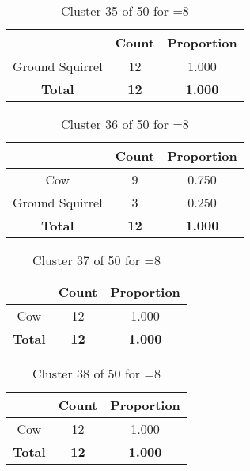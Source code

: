 \begin{table}[ht!]
\centering
\begin{tabular}{|c|c|c|}
\hline
\bf \Spec{} &\bf Count &\bf Proportion\\ \hline \hline
Ground Squirrel & 12 & 1.000\\ \hline
\hline
\bf Total & \bf 12 & \bf 1.000\\ \hline
\end{tabular}
\label{tab:cluster:35:8}
\caption{Cluster 35 of 50 for \minneigh{}=8}
\end{table}

\begin{table}[ht!]
\centering
\begin{tabular}{|c|c|c|}
\hline
\bf \Spec{} &\bf Count &\bf Proportion\\ \hline \hline
Cow & 9 & 0.750\\ \hline
Ground Squirrel & 3 & 0.250\\ \hline
\hline
\bf Total & \bf 12 & \bf 1.000\\ \hline
\end{tabular}
\label{tab:cluster:36:8}
\caption{Cluster 36 of 50 for \minneigh{}=8}
\end{table}

\begin{table}[ht!]
\centering
\begin{tabular}{|c|c|c|}
\hline
\bf \Spec{} &\bf Count &\bf Proportion\\ \hline \hline
Cow & 12 & 1.000\\ \hline
\hline
\bf Total & \bf 12 & \bf 1.000\\ \hline
\end{tabular}
\label{tab:cluster:37:8}
\caption{Cluster 37 of 50 for \minneigh{}=8}
\end{table}

\begin{table}[ht!]
\centering
\begin{tabular}{|c|c|c|}
\hline
\bf \Spec{} &\bf Count &\bf Proportion\\ \hline \hline
Cow & 12 & 1.000\\ \hline
\hline
\bf Total & \bf 12 & \bf 1.000\\ \hline
\end{tabular}
\label{tab:cluster:38:8}
\caption{Cluster 38 of 50 for \minneigh{}=8}
\end{table}

